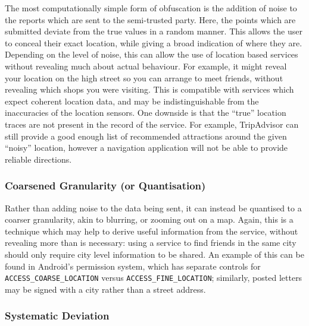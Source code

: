\documentclass{IOS-Book-Article}     %
\newcommand{\tbox}[3][red]{{
\color{#1}\noindent{
   \fbox{\scriptsize{ {\bf #2} \textsl{#3}}}
   \vspace{2pt}
}
}}
\newcommand{\todo}[1]{\tbox{TODO:}{#1}}
\begin{document}
The most computationally simple form of obfuscation is the addition of noise to
the reports which are sent to the semi-trusted party. Here, the points which are
submitted deviate from the true values in a random manner. This allows the user
to conceal their exact location, while giving a broad indication of where they
are. Depending on the level of noise, this can allow the use of location
based services without revealing much about actual behaviour. For example, it
might reveal your location on the high street so you can arrange to meet
friends, without revealing which shops you were visiting. This is compatible
with services which expect coherent location data, and may be indistinguishable
from the inaccuracies of the location sensors. One downside is that the ``true''
location traces are not present in the record of the service.
For example, TripAdvisor can still provide a good enough list of recommended 
attractions around the given ``noisy'' location, however a navigation 
application will not be able to provide reliable directions.

\subsubsection{Coarsened Granularity (or Quantisation)}

Rather than adding noise to the data being sent, it can instead be quantised to
a coarser granularity, akin to blurring, or zooming out on a map. Again, this is
a technique which may help to derive useful information from the service,
without revealing more than is necessary: using a service to find friends in the
same city should only require city level information to be shared. An example of
this can be found in Android's permission system, which has separate controls
for \verb|ACCESS_COARSE_LOCATION| versus \verb|ACCESS_FINE_LOCATION|; similarly,
posted letters may be signed with a city rather than a street address.

\subsubsection{Systematic Deviation}
\end{document}
